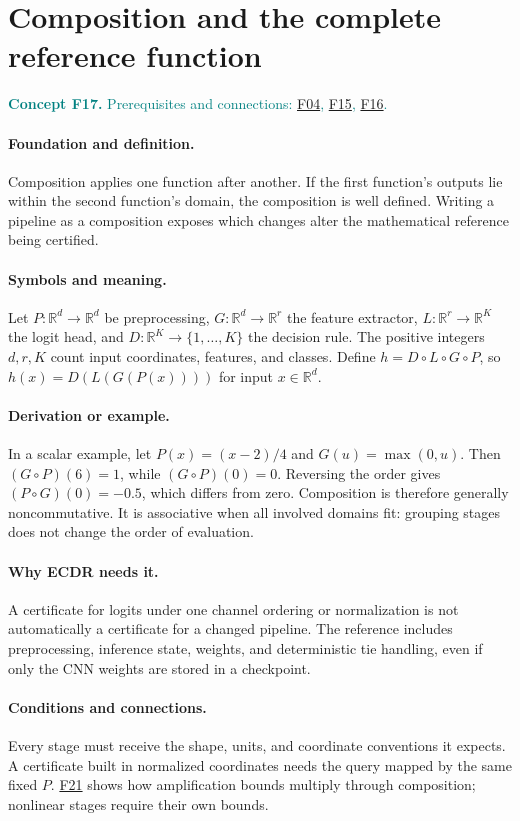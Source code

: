 \documentclass[11pt,a4paper]{article}
\newcommand{\R}{\mathbb R}
\newcommand{\conceptid}{Front matter}
\newcommand{\concept}[3]{\clearpage\renewcommand{\conceptid}{#1}%
\section{#2}\label{concept:#1}%
\textcolor{teal}{\textbf{Concept #1.} Prerequisites and connections: #3.}\par
\typeout{ECDR-CONCEPT-START #1 PAGE=\thepage}}
\begin{document}
\concept{F17}{Composition and the complete reference function}{\hyperref[concept:F04]{F04}, \hyperref[concept:F15]{F15}, \hyperref[concept:F16]{F16}}
\paragraph{Foundation and definition.}
Composition applies one function after another. If the first function's
outputs lie within the second function's domain, the composition is
well defined. Writing a pipeline as a composition exposes which changes
alter the mathematical reference being certified.
\paragraph{Symbols and meaning.}
Let $P:\R^{d}\to\R^{d}$ be preprocessing,
$G:\R^{d}\to\R^{r}$ the feature extractor,
$L:\R^{r}\to\R^{K}$ the logit head, and
$D:\R^{K}\to\{1,\ldots,K\}$ the decision rule. The positive
integers $d,r,K$ count input coordinates, features, and classes.
Define $h=D\circ L\circ G\circ P$, so
$h(x)=D(L(G(P(x))))$ for input $x\in\R^d$.
\paragraph{Derivation or example.}
In a scalar example, let $P(x)=(x-2)/4$ and $G(u)=\max(0,u)$.
Then $(G\circ P)(6)=1$, while $(G\circ P)(0)=0$.
Reversing the order gives $(P\circ G)(0)=-0.5$, which differs from
zero. Composition is therefore generally noncommutative. It is
associative when all involved domains fit: grouping stages does not
change the order of evaluation.
\paragraph{Why ECDR needs it.}
A certificate for logits under one channel ordering or normalization is
not automatically a certificate for a changed pipeline. The reference
includes preprocessing, inference state, weights, and deterministic tie
handling, even if only the CNN weights are stored in a checkpoint.
\paragraph{Conditions and connections.}
Every stage must receive the shape, units, and coordinate conventions it
expects. A certificate built in normalized coordinates needs the query
mapped by the same fixed $P$. \hyperref[concept:F21]{F21} shows how amplification bounds
multiply through composition; nonlinear stages require their own bounds.
\par\label{endconcept:F17}
\end{document}
